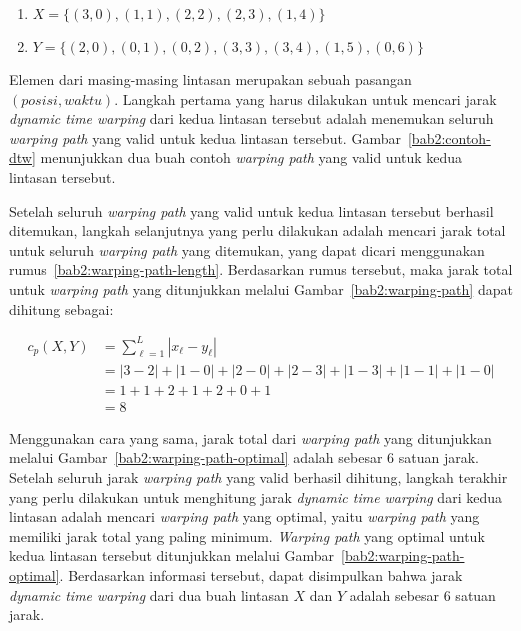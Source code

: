 \begin{enumerate}
    \item $X = \{ (3, 0), (1, 1), (2, 2), (2, 3), (1, 4) \}$
    \item $Y = \{ (2, 0), (0, 1), (0, 2), (3, 3), (3, 4), (1, 5), (0, 6) \}$
\end{enumerate}

Elemen dari masing-masing lintasan merupakan sebuah pasangan $(posisi, waktu)$. Langkah pertama yang harus dilakukan untuk mencari jarak \textit{dynamic time warping} dari kedua lintasan tersebut adalah menemukan seluruh \textit{warping path} yang valid untuk kedua lintasan tersebut. Gambar~\ref{bab2:contoh-dtw} menunjukkan dua buah contoh \textit{warping path} yang valid untuk kedua lintasan tersebut.

Setelah seluruh \textit{warping path} yang valid untuk kedua lintasan tersebut berhasil ditemukan, langkah selanjutnya yang perlu dilakukan adalah mencari jarak total untuk seluruh \textit{warping path} yang ditemukan, yang dapat dicari menggunakan rumus~\ref{bab2:warping-path-length}. Berdasarkan rumus tersebut, maka jarak total untuk \textit{warping path} yang ditunjukkan melalui Gambar~\ref{bab2:warping-path} dapat dihitung sebagai:

\begin{align*}
    c_p(X, Y) & = \sum_{\ell = 1}^{L} |x_\ell - y_\ell| \\
    & = |3 - 2| + |1 - 0| + |2 - 0| + |2 - 3| + |1 - 3| + |1 - 1| + |1 - 0| \\
    & = 1 + 1 + 2 + 1 + 2 + 0 + 1 \\
    & = 8
\end{align*}

Menggunakan cara yang sama, jarak total dari \textit{warping path} yang ditunjukkan melalui Gambar~\ref{bab2:warping-path-optimal} adalah sebesar $6$ satuan jarak. Setelah seluruh jarak \textit{warping path} yang valid berhasil dihitung, langkah terakhir yang perlu dilakukan untuk menghitung jarak \textit{dynamic time warping} dari kedua lintasan adalah mencari \textit{warping path} yang optimal, yaitu \textit{warping path} yang memiliki jarak total yang paling minimum. \textit{Warping path} yang optimal untuk kedua lintasan tersebut ditunjukkan melalui Gambar~\ref{bab2:warping-path-optimal}. Berdasarkan informasi tersebut, dapat disimpulkan bahwa jarak \textit{dynamic time warping} dari dua buah lintasan $X$ dan $Y$ adalah sebesar $6$ satuan jarak.

